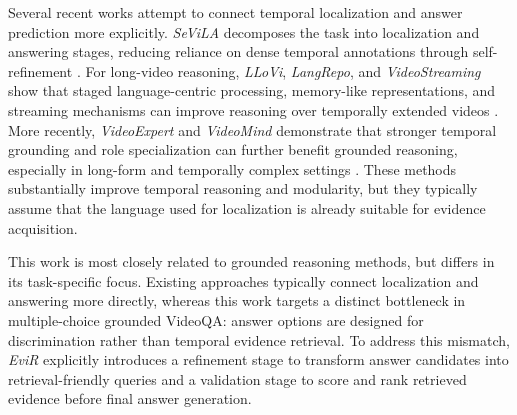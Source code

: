 Several recent works attempt to connect temporal localization and answer prediction more explicitly. \emph{SeViLA} decomposes the task into localization and answering stages, reducing reliance on dense temporal annotations through self-refinement \cite{yu2023sevila}. For long-video reasoning, \emph{LLoVi}, \emph{LangRepo}, and \emph{VideoStreaming} show that staged language-centric processing, memory-like representations, and streaming mechanisms can improve reasoning over temporally extended videos \cite{zhang2024simple, kahatapitiya2025language, qian2024streaming}. More recently, \emph{VideoExpert} and \emph{VideoMind} demonstrate that stronger temporal grounding and role specialization can further benefit grounded reasoning, especially in long-form and temporally complex settings \cite{zhao2025videoexpert, liu2025videomind}. These methods substantially improve temporal reasoning and modularity, but they typically assume that the language used for localization is already suitable for evidence acquisition.

This work is most closely related to grounded reasoning methods, but differs in its task-specific focus. Existing approaches typically connect localization and answering more directly, whereas this work targets a distinct bottleneck in multiple-choice grounded VideoQA: answer options are designed for discrimination rather than temporal evidence retrieval. To address this mismatch, \emph{EviR} explicitly introduces a refinement stage to transform answer candidates into retrieval-friendly queries and a validation stage to score and rank retrieved evidence before final answer generation.
